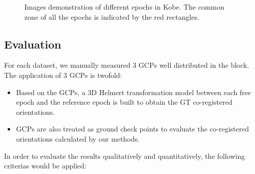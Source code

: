 \begin{figure}[htbp]
\begin{center}
{\begin{minipage}[t]{1\linewidth}
            \end{minipage}%
        }
        \caption{Images demonstration of different epochs in Kobe. The common zone of all the epochs is indicated by the red rectangles.}
        \label{KobeData}
    \end{center}
\end{figure} 

\subsection{Evaluation}
For each dataset, we manually measured 3 GCPs well distributed in the block. The application of 3 GCPs is twofold:\\
\begin{itemize}
    \item Based on the GCPs, a 3D Helmert transformation model between each free epoch and the reference epoch is built to obtain the GT co-registered orientations.
    \item GCPs are also treated as ground check points to evaluate the co-registered orientations calculated by our methods.
\end{itemize}
In order to evaluate the results qualitatively and quantitatively, the following criterias would be applied:\\
